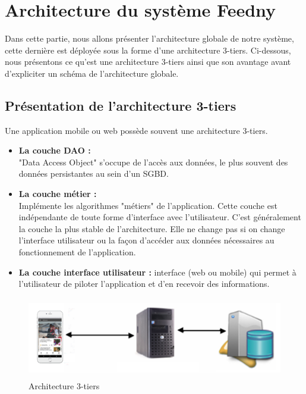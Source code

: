 \section{Architecture du système \textquotedbl Feedny\textquotedbl}
Dans cette partie, nous allons présenter l'architecture globale de notre système, cette dernière est déployée sous la forme d'une architecture 3-tiers. Ci-dessous, nous présentons ce qu'est une architecture 3-tiers ainsi que son avantage avant d'expliciter un schéma de l'architecture globale.

\subsection{Présentation de l'architecture 3-tiers}
Une application mobile ou web possède souvent une architecture 3-tiers.
\begin{itemize}
    \item\textbf{La couche DAO : }\\
    "Data Access Object" s'occupe de l'accès aux données, le plus souvent des données persistantes au sein d'un SGBD.\\
    \item\textbf{La couche métier : }\\
    Implémente les algorithmes "métiers" de l'application. Cette couche est indépendante de toute forme d'interface avec l'utilisateur. C'est généralement la couche la plus stable de l'architecture. Elle ne change pas si on change l'interface utilisateur ou la façon d'accéder aux données nécessaires au fonctionnement de l'application.\\
    \item\textbf{La couche interface utilisateur : }interface (web ou mobile) qui permet à l'utilisateur de piloter l'application et d'en recevoir des informations.
\end{itemize}

\begin{figure}[H]
    \centering
    \includegraphics[height=100pt,width=400pt]{img/chapter3/tiers.png}
    \caption{Architecture 3-tiers}
\end{figure}

